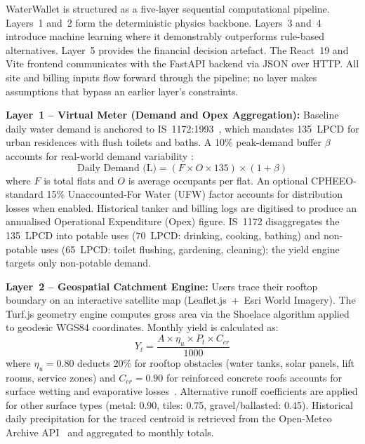 ﻿\documentclass[conference]{IEEEtran}
\begin{document}
WaterWallet is structured as a five-layer sequential computational pipeline. Layers~1 and~2 form the deterministic physics backbone. Layers~3 and~4 introduce machine learning where it demonstrably outperforms rule-based alternatives. Layer~5 provides the financial decision artefact. The React~19 and Vite frontend communicates with the FastAPI backend via JSON over HTTP. All site and billing inputs flow forward through the pipeline; no layer makes assumptions that bypass an earlier layer's constraints.

\textbf{Layer~1 -- Virtual Meter (Demand and Opex Aggregation):}
Baseline daily water demand is anchored to IS~1172:1993~\cite{bis1172}, which mandates 135~LPCD for urban residences with flush toilets and baths. A 10\% peak-demand buffer $\beta$ accounts for real-world demand variability \cite{cpheeo2024}:
\begin{equation}
  \text{Daily Demand (L)} = (F \times O \times 135) \times (1 + \beta)
  \label{eq:demand}
\end{equation}
where $F$ is total flats and $O$ is average occupants per flat. An optional CPHEEO-standard 15\% Unaccounted-For Water (UFW) factor accounts for distribution losses when enabled. Historical tanker and billing logs are digitised to produce an annualised Operational Expenditure (Opex) figure. IS~1172 disaggregates the 135~LPCD into potable uses (70~LPCD: drinking, cooking, bathing) and non-potable uses (65~LPCD: toilet flushing, gardening, cleaning); the yield engine targets only non-potable demand.

\textbf{Layer~2 -- Geospatial Catchment Engine:}
Users trace their rooftop boundary on an interactive satellite map (Leaflet.js~+~Esri World Imagery). The Turf.js geometry engine computes gross area via the Shoelace algorithm applied to geodesic WGS84 coordinates. Monthly yield is calculated as:
\begin{equation}
  Y_t = \frac{A \times \eta_u \times P_t \times C_{cr}}{1000}
  \label{eq:yield}
\end{equation}
where $\eta_u = 0.80$ deducts 20\% for rooftop obstacles (water tanks, solar panels, lift rooms, service zones) and $C_{cr} = 0.90$ for reinforced concrete roofs accounts for surface wetting and evaporative losses~\cite{cpheeo2024}. Alternative runoff coefficients are applied for other surface types (metal: 0.90, tiles: 0.75, gravel/ballasted: 0.45). Historical daily precipitation for the traced centroid is retrieved from the Open-Meteo Archive API~\cite{openmeteo} and aggregated to monthly totals.
\end{document}
